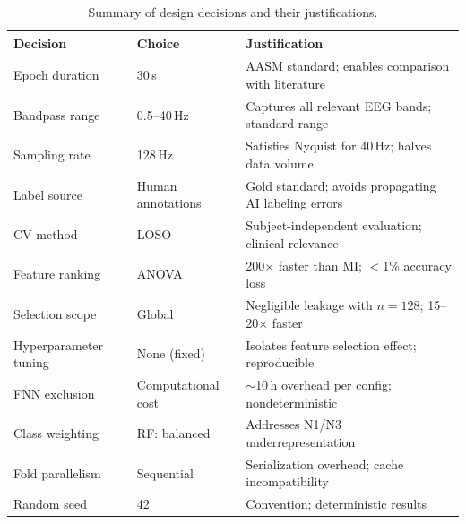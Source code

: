 \begin{table}[h]
\centering
\caption{Summary of design decisions and their justifications.}
\label{tab:decisions}
\begin{tabular}{p{4cm} p{3cm} p{6cm}}
\toprule
\textbf{Decision} & \textbf{Choice} & \textbf{Justification} \\
\midrule
Epoch duration & 30\,s & AASM standard; enables comparison with literature \\
Bandpass range & 0.5--40\,Hz & Captures all relevant EEG bands; standard range \\
Sampling rate & 128\,Hz & Satisfies Nyquist for 40\,Hz; halves data volume \\
Label source & Human annotations & Gold standard; avoids propagating AI labeling errors \\
CV method & LOSO & Subject-independent evaluation; clinical relevance \\
Feature ranking & ANOVA & 200$\times$ faster than MI; $<$1\% accuracy loss \\
Selection scope & Global & Negligible leakage with $n=128$; 15--20$\times$ faster \\
Hyperparameter tuning & None (fixed) & Isolates feature selection effect; reproducible \\
FNN exclusion & Computational cost & $\sim$10\,h overhead per config; nondeterministic \\
Class weighting & RF: balanced & Addresses N1/N3 underrepresentation \\
Fold parallelism & Sequential & Serialization overhead; cache incompatibility \\
Random seed & 42 & Convention; deterministic results \\
\bottomrule
\end{tabular}
\end{table}
